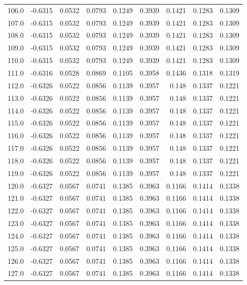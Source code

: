 \begin{longtable}{lrrrrrrrr}
106.0 & -0.6315 & 0.0532 & 0.0793 & 0.1249 & 0.3939 & 0.1421 & 0.1283 & 0.1309 \\
107.0 & -0.6315 & 0.0532 & 0.0793 & 0.1249 & 0.3939 & 0.1421 & 0.1283 & 0.1309 \\
108.0 & -0.6315 & 0.0532 & 0.0793 & 0.1249 & 0.3939 & 0.1421 & 0.1283 & 0.1309 \\
109.0 & -0.6315 & 0.0532 & 0.0793 & 0.1249 & 0.3939 & 0.1421 & 0.1283 & 0.1309 \\
110.0 & -0.6315 & 0.0532 & 0.0793 & 0.1249 & 0.3939 & 0.1421 & 0.1283 & 0.1309 \\
111.0 & -0.6316 & 0.0528 & 0.0869 & 0.1105 & 0.3958 & 0.1436 & 0.1318 & 0.1319 \\
112.0 & -0.6326 & 0.0522 & 0.0856 & 0.1139 & 0.3957 & 0.148 & 0.1337 & 0.1221 \\
113.0 & -0.6326 & 0.0522 & 0.0856 & 0.1139 & 0.3957 & 0.148 & 0.1337 & 0.1221 \\
114.0 & -0.6326 & 0.0522 & 0.0856 & 0.1139 & 0.3957 & 0.148 & 0.1337 & 0.1221 \\
115.0 & -0.6326 & 0.0522 & 0.0856 & 0.1139 & 0.3957 & 0.148 & 0.1337 & 0.1221 \\
116.0 & -0.6326 & 0.0522 & 0.0856 & 0.1139 & 0.3957 & 0.148 & 0.1337 & 0.1221 \\
117.0 & -0.6326 & 0.0522 & 0.0856 & 0.1139 & 0.3957 & 0.148 & 0.1337 & 0.1221 \\
118.0 & -0.6326 & 0.0522 & 0.0856 & 0.1139 & 0.3957 & 0.148 & 0.1337 & 0.1221 \\
119.0 & -0.6326 & 0.0522 & 0.0856 & 0.1139 & 0.3957 & 0.148 & 0.1337 & 0.1221 \\
120.0 & -0.6327 & 0.0567 & 0.0741 & 0.1385 & 0.3963 & 0.1166 & 0.1414 & 0.1338 \\
121.0 & -0.6327 & 0.0567 & 0.0741 & 0.1385 & 0.3963 & 0.1166 & 0.1414 & 0.1338 \\
122.0 & -0.6327 & 0.0567 & 0.0741 & 0.1385 & 0.3963 & 0.1166 & 0.1414 & 0.1338 \\
123.0 & -0.6327 & 0.0567 & 0.0741 & 0.1385 & 0.3963 & 0.1166 & 0.1414 & 0.1338 \\
124.0 & -0.6327 & 0.0567 & 0.0741 & 0.1385 & 0.3963 & 0.1166 & 0.1414 & 0.1338 \\
125.0 & -0.6327 & 0.0567 & 0.0741 & 0.1385 & 0.3963 & 0.1166 & 0.1414 & 0.1338 \\
126.0 & -0.6327 & 0.0567 & 0.0741 & 0.1385 & 0.3963 & 0.1166 & 0.1414 & 0.1338 \\
127.0 & -0.6327 & 0.0567 & 0.0741 & 0.1385 & 0.3963 & 0.1166 & 0.1414 & 0.1338 \\

\end{longtable}
